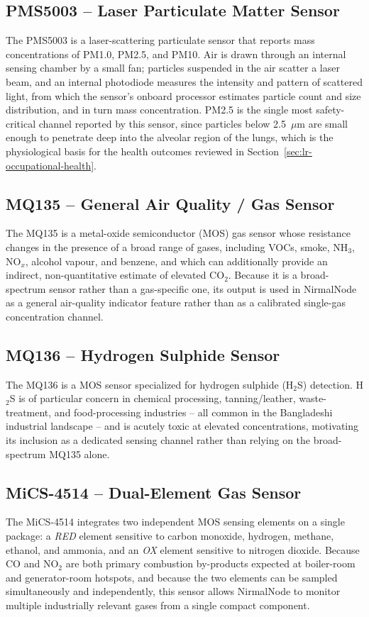 \subsection{PMS5003 -- Laser Particulate Matter Sensor}
The PMS5003 is a laser-scattering particulate sensor that reports mass concentrations of PM1.0, PM2.5, and PM10. Air is drawn through an internal sensing chamber by a small fan; particles suspended in the air scatter a laser beam, and an internal photodiode measures the intensity and pattern of scattered light, from which the sensor's onboard processor estimates particle count and size distribution, and in turn mass concentration. PM2.5 is the single most safety-critical channel reported by this sensor, since particles below 2.5~$\mu$m are small enough to penetrate deep into the alveolar region of the lungs, which is the physiological basis for the health outcomes reviewed in Section~\ref{sec:lr-occupational-health}.

\subsection{MQ135 -- General Air Quality / Gas Sensor}
The MQ135 is a metal-oxide semiconductor (MOS) gas sensor whose resistance changes in the presence of a broad range of gases, including VOCs, smoke, NH$_3$, NO$_x$, alcohol vapour, and benzene, and which can additionally provide an indirect, non-quantitative estimate of elevated CO$_2$. Because it is a broad-spectrum sensor rather than a gas-specific one, its output is used in NirmalNode as a general air-quality indicator feature rather than as a calibrated single-gas concentration channel.

\subsection{MQ136 -- Hydrogen Sulphide Sensor}
The MQ136 is a MOS sensor specialized for hydrogen sulphide (H$_2$S) detection. H$_2$S is of particular concern in chemical processing, tanning/leather, waste-treatment, and food-processing industries -- all common in the Bangladeshi industrial landscape -- and is acutely toxic at elevated concentrations, motivating its inclusion as a dedicated sensing channel rather than relying on the broad-spectrum MQ135 alone.

\subsection{MiCS-4514 -- Dual-Element Gas Sensor}
The MiCS-4514 integrates two independent MOS sensing elements on a single package: a \emph{RED} element sensitive to carbon monoxide, hydrogen, methane, ethanol, and ammonia, and an \emph{OX} element sensitive to nitrogen dioxide. Because CO and NO$_2$ are both primary combustion by-products expected at boiler-room and generator-room hotspots, and because the two elements can be sampled simultaneously and independently, this sensor allows NirmalNode to monitor multiple industrially relevant gases from a single compact component.

